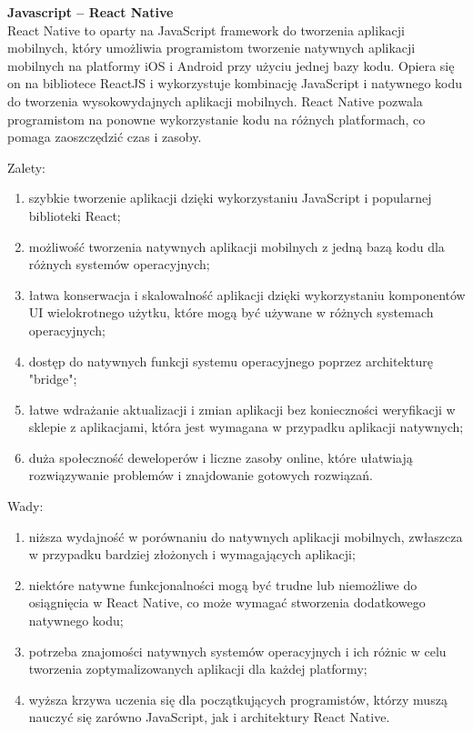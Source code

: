 \documentclass[12pt, a4paper, twoside, openany]{book}
\begin{document}
\textbf{Javascript -- React Native\\}
React Native to oparty na JavaScript framework do tworzenia aplikacji mobilnych, który umożliwia programistom tworzenie natywnych aplikacji mobilnych na platformy iOS i Android przy użyciu jednej bazy kodu.
Opiera się on na bibliotece ReactJS i wykorzystuje kombinację JavaScript i natywnego kodu do tworzenia wysokowydajnych aplikacji mobilnych.
React Native pozwala programistom na ponowne wykorzystanie kodu na różnych platformach, co pomaga zaoszczędzić czas i zasoby.

Zalety:
\begin{enumerate}[label=--]
    \item szybkie tworzenie aplikacji dzięki wykorzystaniu JavaScript i popularnej biblioteki React;
    \item możliwość tworzenia natywnych aplikacji mobilnych z jedną bazą kodu dla różnych systemów operacyjnych;
    \item łatwa konserwacja i skalowalność aplikacji dzięki wykorzystaniu komponentów UI wielokrotnego użytku, które mogą być używane w różnych systemach operacyjnych;
    \item dostęp do natywnych funkcji systemu operacyjnego poprzez architekturę "bridge";
    \item łatwe wdrażanie aktualizacji i zmian aplikacji bez konieczności weryfikacji w sklepie z aplikacjami, która jest wymagana w przypadku aplikacji natywnych;
    \item duża społeczność deweloperów i liczne zasoby online, które ułatwiają rozwiązywanie problemów i znajdowanie gotowych rozwiązań.
\end{enumerate}

Wady:
\begin{enumerate}[label=--]
    \item niższa wydajność w porównaniu do natywnych aplikacji mobilnych, zwłaszcza w przypadku bardziej złożonych i wymagających aplikacji;
    \item niektóre natywne funkcjonalności mogą być trudne lub niemożliwe do osiągnięcia w React Native, co może wymagać stworzenia dodatkowego natywnego kodu;
    \item potrzeba znajomości natywnych systemów operacyjnych i ich różnic w celu tworzenia zoptymalizowanych aplikacji dla każdej platformy;
    \item wyższa krzywa uczenia się dla początkujących programistów, którzy muszą nauczyć się zarówno JavaScript, jak i architektury React Native.
\end{enumerate}
\end{document}
